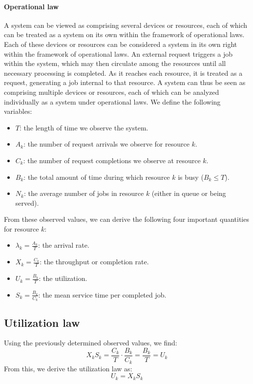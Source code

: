 \paragraph*{Operational law}
A system can be viewed as comprising several devices or resources, each of which can be treated as a system on its own within the framework of operational laws.
Each of these devices or resources can be considered a system in its own right within the framework of operational laws.
An external request triggers a job within the system, which may then circulate among the resources until all necessary processing is completed. 
As it reaches each resource, it is treated as a request, generating a job internal to that resource.
A system can thus be seen as comprising multiple devices or resources, each of which can be analyzed individually as a system under operational laws.
We define the following variables:
\begin{itemize}
    \item $T$: the length of time we observe the system.
    \item $A_k$: the number of request arrivals we observe for resource $k$. 
    \item $C_k$: the number of request completions we observe at resource $k$. 
    \item $B_k$: the total amount of time during which resource $k$ is busy ($B_k\leq T$). 
    \item $N_k$: the average number of jobs in resource $k$  (either in queue or being served).
\end{itemize}
From these observed values, we can derive the following four important quantities for resource $k$:
\begin{itemize}
    \item $\lambda_k=\frac{A_k}{T}$: the arrival rate. 
    \item $X_k=\frac{C_k}{T}$: the throughput or completion rate.
    \item $U_k=\frac{B_k}{T}$: the utilization.
    \item $S_k=\frac{B_k}{C_k}$: the mean service time per completed job.
\end{itemize}

\subsection{Utilization law}
Using the previously determined observed values, we find:
\[X_k S_k = \dfrac{C_k}{T} \cdot \dfrac{B_k}{C_k} = \dfrac{B_k}{T}=U_k\]
From this, we derive the utilization law as:
\[U_k=X_k S_k\]

